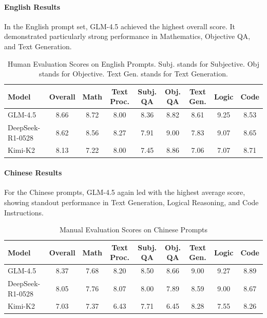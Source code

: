 \paragraph{English Results}
In the English prompt set, GLM-4.5 achieved the highest overall score. It demonstrated particularly strong performance in Mathematics, Objective QA, and Text Generation.
\begin{table}[h!]
\centering
\caption{Human Evaluation Scores on English Prompts. Subj. stands for Subjective. Obj stands for Objective. Text Gen. stands for Text Generation.}
\label{tab:eng-results}
\footnotesize
\begin{tabular}{@{}l@{}cccccccc@{}}
\toprule
\textbf{Model} & \textbf{Overall} & \textbf{Math} & \textbf{Text Proc.} & \textbf{Subj. QA} & \textbf{Obj. QA} & \textbf{Text Gen.} & \textbf{Logic}& \textbf{Code} \\
\midrule
GLM-4.5 & 8.66 & 8.72 & 8.00 & 8.36 & 8.82 & 8.61 & 9.25 & 8.53 \\
DeepSeek-R1-0528 & 8.62 & 8.56 & 8.27 & 7.91 & 9.00 & 7.83 &9.07 & 8.65 \\
Kimi-K2 & 8.13 & 7.22 & 8.00 & 7.45 & 8.86 & 7.06 &7.07 & 8.71 \\
\bottomrule
\end{tabular}
\end{table}

\paragraph{Chinese Results}
For the Chinese prompts, GLM-4.5 again led with the highest average score, showing standout performance in Text Generation, Logical Reasoning, and Code Instructions.
\begin{table}[h!]
\centering
\caption{Manual Evaluation Scores on Chinese Prompts}
\label{tab:chn-results}
\footnotesize
\begin{tabular}{@{}l@{}cccccccc@{}}
\toprule
\textbf{Model} & \textbf{Overall} & \textbf{Math} & \textbf{Text Proc.} & \textbf{Subj. QA} & \textbf{Obj. QA} & \textbf{Text Gen.} & \textbf{Logic} & \textbf{Code} \\
\midrule
GLM-4.5 & 8.37 & 7.68 & 8.20 & 8.50 & 8.66 & 9.00 & 9.27 & 8.89 \\
DeepSeek-R1-0528 & 8.05 & 7.76 & 8.07 & 8.00 & 7.89 & 8.59 & 9.00 & 8.67 \\
Kimi-K2 & 7.03 & 7.37 & 6.43 & 7.71 & 6.45 & 8.28 & 7.55 & 8.26 \\
\bottomrule
\end{tabular}
\end{table}

